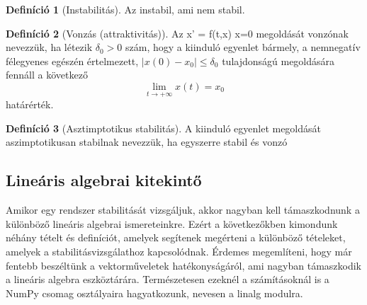 \documentclass{article}
\theoremstyle{definition}
\theoremstyle{theorem}
\newtheorem{definition}{Definíció}
\begin{document}
\begin{definition}[Instabilitás]
Az instabil, ami nem stabil.
\end{definition}

\begin{definition}[Vonzás (attraktivitás)]
Az x' = f(t,x) x=0 megoldását vonzónak nevezzük, ha létezik
$\delta_0 > 0$ szám, hogy a kiinduló egyenlet bármely,  a nemnegatív félegyenes egészén értelmezett, $|x(0) - x_0| \leq \delta_0$ tulajdonságú megoldására fennáll a következő
\begin{equation*}
    \lim_{t \rightarrow + \infty} x(t) = x_0
\end{equation*}
határérték.
\end{definition}
\begin{definition}[Asztimptotikus stabilitás]
A kiinduló egyenlet megoldását aszimptotikusan stabilnak nevezzük, ha egyszerre stabil és vonzó
\end{definition}

\subsection{Lineáris algebrai kitekintő}
Amikor egy rendszer stabilitását vizsgáljuk, akkor nagyban kell támaszkodnunk a különböző lineáris algebrai ismereteinkre. Ezért a következőkben kimondunk néhány tételt és definíciót, amelyek segítenek megérteni a különböző tételeket, amelyek a stabilitásvizsgálathoz kapcsolódnak. Érdemes megemlíteni, hogy már fentebb beszéltünk a vektorműveletek hatékonyságáról, ami nagyban támaszko\-dik a lineáris algebra eszköztárára. Természetesen ezeknél a számításoknál is a NumPy csomag osztályaira hagyatkozunk, nevesen a linalg modulra.
\end{document}
